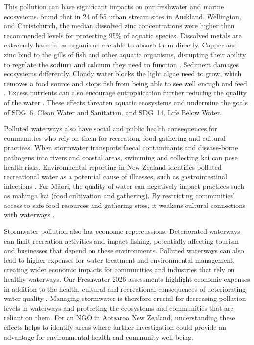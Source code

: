 \documentclass[11pt,a4paper]{article}
\begin{document}
This pollution can have significant impacts on our freshwater and marine ecosystems. \citet{niwa2021} found that in 24 of 55 urban stream sites in Auckland, Wellington, and Christchurch, the median dissolved zinc concentrations were higher than recommended levels for protecting 95\% of aquatic species. Dissolved metals are extremely harmful as organisms are able to absorb them directly. Copper and zinc bind to the gills of fish and other aquatic organisms, disrupting their ability to regulate the sodium and calcium they need to function \citep{gadd2024}. Sediment damages ecosystems differently. Cloudy water blocks the light algae need to grow, which removes a food source and stops fish from being able to see well enough and feed \citep{esnz_sediment}. Excess nutrients can also encourage eutrophication further reducing the quality of the water \citep{mfe_stats2020}. These effects threaten aquatic ecosystems and undermine the goals of SDG~6, Clean Water and Sanitation, and SDG~14, Life Below Water.

Polluted waterways also have social and public health consequences for communities who rely on them for recreation, food gathering and cultural practices. When stormwater transports faecal contaminants and disease-borne pathogens into rivers and coastal areas, swimming and collecting kai can pose health risks. Environmental reporting in New Zealand identifies polluted recreational water as a potential cause of illnesses, such as gastrointestinal infections \citep{mfe_stats2025_env}. For M\=aori, the quality of water can negatively impact practices such as mahinga kai (food cultivation and gathering). By restricting communities' access to safe food resources and gathering sites, it weakens cultural connections with waterways \citep{mfe_stats2025_env}.

Stormwater pollution also has economic repercussions. Deteriorated waterways can limit recreation activities and impact fishing, potentially affecting tourism and businesses that depend on these environments. Polluted waterways can also lead to higher expenses for water treatment and environmental management, creating wider economic impacts for communities and industries that rely on healthy waterways. Our Freshwater 2026 assessments highlight economic expenses in addition to the health, cultural and recreational consequences of deteriorating water quality \citep{mfe_stats2026}. Managing stormwater is therefore crucial for decreasing pollution levels in waterways and protecting the ecosystems and communities that are reliant on them. For an NGO in Aotearoa New Zealand, understanding these effects helps to identify areas where further investigation could provide an advantage for environmental health and community well-being.
\end{document}
